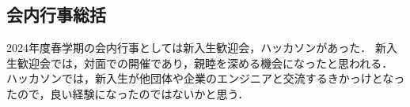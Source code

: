 \subsection*{会内行事総括}


2024年度春学期の会内行事としては新入生歓迎会，ハッカソンがあった．
新入生歓迎会では，対面での開催であり，親睦を深める機会になったと思われる．
ハッカソンでは，新入生が他団体や企業のエンジニアと交流するきかっけとなったので，良い経験になったのではないかと思う．

